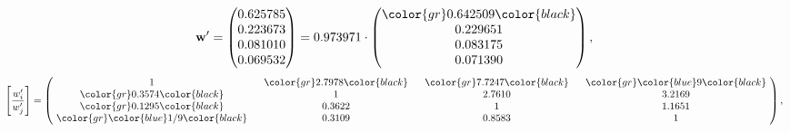 \begin{example}
\begin{equation*}
\mathbf{w}^{\prime} =
\begin{pmatrix}
0.625785\\
0.223673\\
0.081010\\
0.069532
\end{pmatrix} =
0.973971\cdot
\begin{pmatrix}
\color{gr} 0.642509\color{black} \\
0.229651\\
0.083175\\
0.071390
\end{pmatrix},
\end{equation*}
\begin{equation*}
\left[ \frac{{w}^{\prime}_i}{{w}^{\prime}_j} \right] =
\begin{pmatrix}
$\,\,$ 1 $\,\,$ & $\,\,$\color{gr} 2.7978\color{black} $\,\,$ & $\,\,$\color{gr} 7.7247\color{black} $\,\,$ & $\,\,$\color{gr} \color{blue} 9\color{black} $\,\,$ \\
$\,\,$\color{gr} 0.3574\color{black} $\,\,$ & $\,\,$ 1 $\,\,$ & $\,\,$2.7610$\,\,$ & $\,\,$3.2169  $\,\,$ \\
$\,\,$\color{gr} 0.1295\color{black} $\,\,$ & $\,\,$0.3622$\,\,$ & $\,\,$ 1 $\,\,$ & $\,\,$1.1651 $\,\,$ \\
$\,\,$\color{gr} \color{blue}  1/9\color{black} $\,\,$ & $\,\,$0.3109$\,\,$ & $\,\,$0.8583$\,\,$ & $\,\,$ 1  $\,\,$ \\
\end{pmatrix},
\end{equation*}
\end{example}
\newpage
